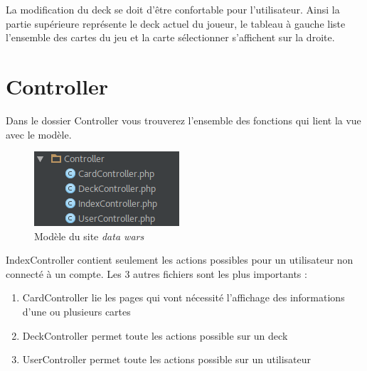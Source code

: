 \documentclass[a4paper, titlepage]{livret}
\begin{document}
	 La modification du deck se doit d'être confortable pour l'utilisateur. Ainsi la partie supérieure représente le deck actuel du joueur, le tableau à gauche liste l'ensemble des cartes du jeu et la carte sélectionner s'affichent sur la droite.

\section{Controller}
	Dans le dossier Controller vous trouverez l'ensemble des fonctions qui lient la vue avec le modèle.

	\begin{figure}[th]
		\begin{center}
		\includegraphics[scale=0.4]{Assets/controller.png}
      		\caption{Modèle du site \textit{data wars}}
      		\label{fig7}
     		\end{center}
	\end{figure}
    
	IndexController contient seulement les actions possibles pour un utilisateur non connecté à un compte. Les 3 autres fichiers sont les plus importants :

	\begin{enumerate}
		\item CardController lie les pages qui vont nécessité l'affichage des informations d'une ou plusieurs cartes
		\item DeckController permet toute les actions possible sur un deck
		\item UserController permet toute les actions possible sur un utilisateur
	\end{enumerate}
\end{document}

